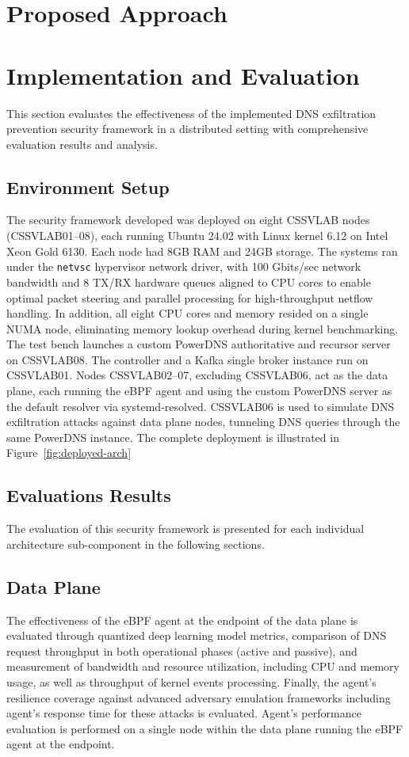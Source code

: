 \documentclass[letterpaper,twocolumn,10pt]{article}
\begin{document}
\section{Proposed Approach}



\section{Implementation and Evaluation}
This section evaluates the effectiveness of the implemented DNS exfiltration prevention security framework in a distributed setting with comprehensive evaluation results and analysis.




\subsection{Environment Setup}
The security framework developed was deployed on eight CSSVLAB nodes (CSSVLAB{01–08}), each running Ubuntu 24.02 with Linux kernel 6.12 on Intel Xeon Gold 6130. Each node had 8GB RAM and 24GB storage. The systems ran under the \texttt{netvsc} hypervisor network driver, with 100 Gbits/sec network bandwidth and 8 TX/RX hardware queues aligned to CPU cores to enable optimal packet steering and parallel processing for high-throughput netflow handling. In addition, all eight CPU cores and memory resided on a single NUMA node, eliminating memory lookup overhead during kernel benchmarking. The test bench launches a custom PowerDNS authoritative and recursor server on CSSVLAB08. The controller and a Kafka single broker instance run on CSSVLAB01. Nodes CSSVLAB{02–07}, excluding CSSVLAB06, act as the data plane, each running the eBPF agent and using the custom PowerDNS server as the default resolver via systemd-resolved. CSSVLAB06 is used to simulate DNS exfiltration attacks against data plane nodes, tunneling DNS queries through the same PowerDNS instance. The complete deployment is illustrated in Figure~\ref{fig:deployed-arch}


\subsection{Evaluations Results}
The evaluation of this security framework is presented for each individual architecture sub-component in the following sections.


\subsection{Data Plane}
The effectiveness of the eBPF agent at the endpoint of the data plane is evaluated through quantized deep learning model metrics, comparison of DNS request throughput in both operational phases (active and passive), and measurement of bandwidth and resource utilization, including CPU and memory usage, as well as throughput of kernel events processing. Finally, the agent’s resilience coverage against advanced adversary emulation frameworks including agent's response time for these attacks is evaluated. Agent's performance evaluation is performed on a single node within the data plane running the eBPF agent at the endpoint.
\end{document}

